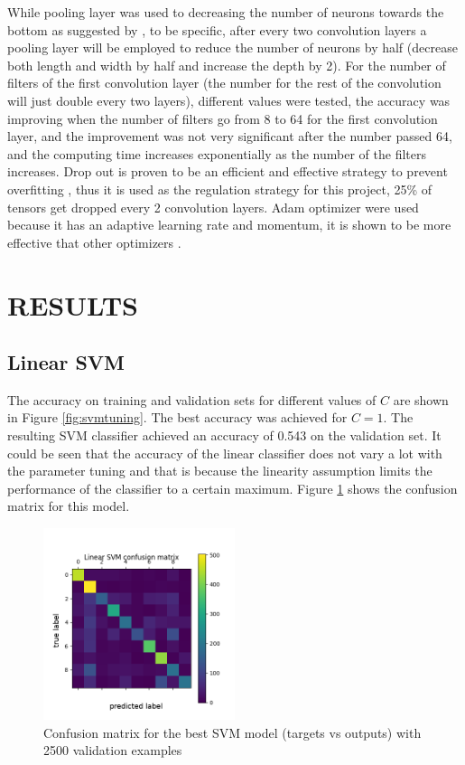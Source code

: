 \documentclass[letterpaper, 10 pt, conference]{ieeeconf}  %
\begin{document}
While pooling layer was used to decreasing the number of neurons towards the bottom as suggested by \cite{lattner2016}, to be specific, after every two convolution layers a pooling layer will be employed to reduce the number of neurons by half (decrease both length and width by half and increase the depth by 2). For the number of filters of the first convolution layer (the number for the rest of the convolution will just double every two layers), different values were tested, the accuracy was improving when the number of filters go from 8 to 64 for the first convolution layer, and the improvement was not very significant after the number passed 64, and the computing time increases exponentially as the number of the filters increases. Drop out is proven to be an efficient and effective strategy to prevent overfitting \cite{srivastava2014dropout}, thus it is used as the regulation strategy for this project, 25\% of tensors get dropped every 2 convolution layers. Adam optimizer were used because it has an adaptive learning rate and momentum, it is shown to be more effective that other optimizers \cite{walia2017opt}.

\section{RESULTS}

\subsection{Linear SVM}
The accuracy on training and validation sets for different values of $C$ are shown in Figure \ref{fig:svmtuning}. The best accuracy was achieved for $C=1$. The resulting SVM classifier achieved an accuracy of 0.543 on the validation set. It could be seen that the accuracy of the linear classifier does not vary a lot with the parameter tuning and that is because the linearity assumption limits the performance of the classifier to a certain maximum. Figure \ref{fig:svmconf} shows the confusion matrix for this model.


\begin{figure}[h]
	\begin{center}
			\includegraphics[width=0.5\textwidth]{figures/svm_conf.png}  %
		\caption{Confusion matrix for the best SVM model (targets vs outputs) with 2500 validation examples}
		\label{fig:svmconf}
	\end{center}
\end{figure}
\end{document}
